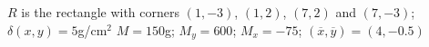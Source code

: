 {$R$ is the rectangle with corners $(1,-3)$, $(1,2)$, $(7,2)$ and $(7,-3)$; $\delta(x,y) = 5$g/cm$^2$\label{ex_13_04_ex_11}
}
{$M = 150$g;  $M_y=600$; $M_x=-75$; $(\overline{x},\overline{y}) = (4,-0.5)$
}